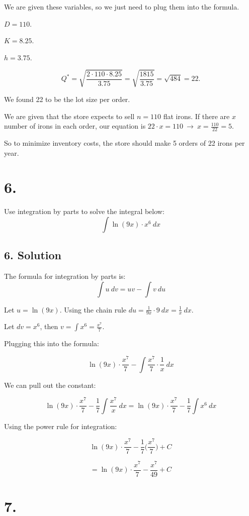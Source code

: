 \documentclass[]{article}
\begin{document}
We are given these variables, so we just need to plug them into the
formula.

\(D = 110\).

\(K = 8.25\).

\(h = 3.75\).

\[
Q^* = \sqrt{\frac{2\cdot 110\cdot 8.25}{3.75}} = \sqrt{\frac{1815}{3.75}} = \sqrt{484} = 22.
\]

We found 22 to be the lot size per order.

We are given that the store expects to sell \(n = 110\) flat irons. If
there are \(x\) number of irons in each order, our equation is
\(22\cdot x = 110 \ \to \ x = \frac{110}{22} = 5\).

So to minimize inventory costs, the store should make 5 orders of 22
irons per year.

\section{6.}\label{section-5}

Use integration by parts to solve the integral below: \[
\int \ln(9x)\cdot x^6 \ dx
\]

\subsection{6. Solution}\label{solution-5}

The formula for integration by parts is: \[
\int u \ dv = uv - \int v \ du
\]

Let \(u = \ln(9x)\). Using the chain rule
\(du = \frac{1}{9x} \cdot 9 \ dx = \frac{1}{x} \ dx\).

Let \(dv = x^6\), then \(v = \int x^6 = \frac{x^7}{7}\).

Plugging this into the formula:

\[
\ln(9x)\cdot \frac{x^7}{7} - \int \frac{x^7}{7}\cdot \frac{1}{x} \ dx
\]

We can pull out the constant:

\[
\ln(9x)\cdot \frac{x^7}{7} - \frac{1}{7} \int \frac{x^7}{x} \ dx = \ln(9x)\cdot \frac{x^7}{7} - \frac{1}{7} \int x^6 \ dx
\]

Using the power rule for integration:

\[
\ln(9x)\cdot \frac{x^7}{7} - \frac{1}{7} \Big(\frac{x^7}{7}\Big) + C
\]

\[
= \ln(9x)\cdot \frac{x^7}{7} - \frac{x^7}{49} + C
\]

\section{7.}\label{section-6}
\end{document}
